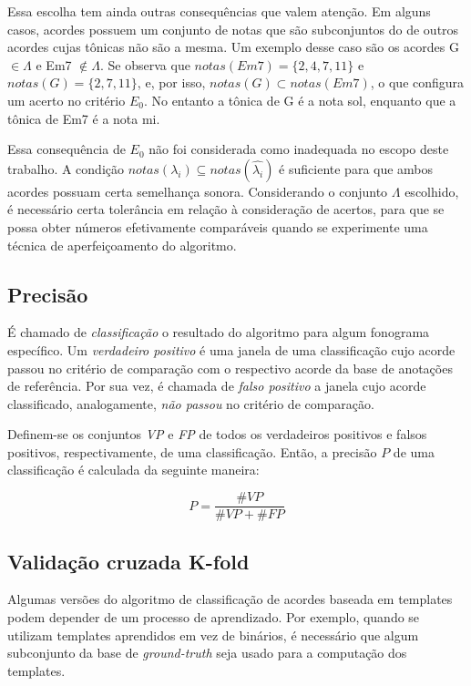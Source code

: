         Essa escolha tem ainda outras consequências que valem atenção. Em alguns casos, acordes possuem um conjunto de notas que são subconjuntos do de outros acordes cujas tônicas não são a mesma. Um exemplo desse caso são os acordes G $\in \Lambda$ e Em7 $\notin \Lambda$. Se observa que $notas(Em7) = \{ 2, 4, 7, 11 \}$ e $notas(G) = \{ 2, 7, 11 \}$, e, por isso, $notas(G) \subset notas(Em7)$, o que configura um acerto no critério $E_0$. No entanto a tônica de G é a nota sol, enquanto que a tônica de Em7 é a nota mi.
        
        Essa consequência de $E_0$ não foi considerada como inadequada no escopo deste trabalho. A condição $notas(\lambda_i) \subseteq notas(\hat{\lambda_i})$ é suficiente para que ambos acordes possuam certa semelhança sonora. Considerando o conjunto $\Lambda$ escolhido, é necessário certa tolerância em relação à consideração de acertos, para que se possa obter números efetivamente comparáveis quando se experimente uma técnica de aperfeiçoamento do algoritmo.
        
    
    \subsection{Precisão}
        É chamado de \textit{classificação} o resultado do algoritmo para algum fonograma específico. Um \textit{verdadeiro positivo} é uma janela de uma classificação cujo acorde passou no critério de comparação com o respectivo acorde da base de anotações de referência. Por sua vez, é chamada de \textit{falso positivo} a janela cujo acorde classificado, analogamente, \textit{não passou} no critério de comparação.
        
        Definem-se os conjuntos \textit{VP} e \textit{FP} de todos os verdadeiros positivos e falsos positivos, respectivamente, de uma classificação. Então, a precisão $P$ de uma classificação é calculada da seguinte maneira:
        
        \[
            P = \frac{\#VP}{\#VP + \#FP}
        \]
    
    \subsection{Validação cruzada K-fold}
        Algumas versões do algoritmo de classificação de acordes baseada em templates podem depender de um processo de aprendizado. Por exemplo, quando se utilizam templates aprendidos em vez de binários, é necessário que algum subconjunto da base de \textit{ground-truth} seja usado para a computação dos templates.
        
